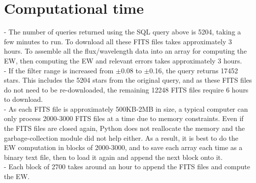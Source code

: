 \documentclass[12pt]{article}
\begin{document}
\section{Computational time}
- The number of queries returned using the SQL query above is 5204, taking a few minutes to run. To download all these FITS files takes approximately 3 hours. To assemble all the flux/wavelength data into an array for computing the EW, then computing the EW and relevant errors takes approximately 3 hours. \\
- If the filter range is increased from $\pm$0.08 to $\pm$0.16, the query returns 17452 stars. This includes the 5204 stars from the original query, and as these FITS files do not need to be re-downloaded, the remaining 12248 FITS files require 6 hours to download.\\
- As each FITS file is approximately 500KB-2MB in size, a typical computer can only process 2000-3000 FITS files at a time due to memory constraints. Even if the FITS files are closed again, Python does not reallocate the memory and the garbage-collection module did not help either. As a result, it is best to do the EW computation in blocks of 2000-3000, and to save each array each time as a binary text file, then to load it again and append the next block onto it.\\
- Each block of 2700 takes around an hour to append the FITS files and compute the EW.
\end{document}
